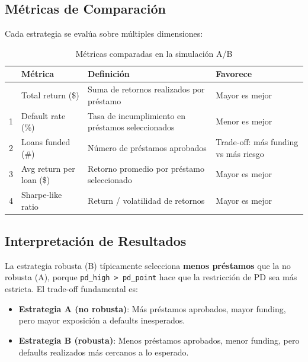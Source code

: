 \documentclass[
  spanish,
  11pt,
  letterpaper,
]{scrbook}
\providecommand{\tightlist}{%
  \setlength{\itemsep}{0pt}\setlength{\parskip}{0pt}}
\theoremstyle{plain}
\theoremstyle{remark}
\begin{document}
\subsection{Métricas de
Comparación}\label{muxe9tricas-de-comparaciuxf3n}

Cada estrategia se evalúa sobre múltiples dimensiones:

{

\begin{longtable}[]{@{}llll@{}}

\caption{\label{tbl-ab-metrics}Métricas comparadas en la simulación A/B}

\tabularnewline

\toprule\noalign{}
& Métrica & Definición & Favorece \\
\midrule\noalign{}
\endhead
\bottomrule\noalign{}
\endlastfoot
0 & Total return (\$) & Suma de retornos realizados por préstamo & Mayor
es mejor \\
1 & Default rate (\%) & Tasa de incumplimiento en préstamos
seleccionados & Menor es mejor \\
2 & Loans funded (\#) & Número de préstamos aprobados & Trade-off: más
funding vs más riesgo \\
3 & Avg return per loan (\$) & Retorno promedio por préstamo
seleccionado & Mayor es mejor \\
4 & Sharpe-like ratio & Return / volatilidad de retornos & Mayor es
mejor \\

\end{longtable}

}

\subsection{Interpretación de
Resultados}\label{interpretaciuxf3n-de-resultados}

La estrategia robusta (B) típicamente selecciona \textbf{menos
préstamos} que la no robusta (A), porque
\texttt{pd\_high\ \textgreater{}\ pd\_point} hace que la restricción de
PD sea más estricta. El trade-off fundamental es:

\begin{itemize}
\tightlist
\item
  \textbf{Estrategia A (no robusta)}: Más préstamos aprobados, mayor
  funding, pero mayor exposición a defaults inesperados.
\item
  \textbf{Estrategia B (robusta)}: Menos préstamos aprobados, menor
  funding, pero defaults realizados más cercanos a lo esperado.
\end{itemize}
\end{document}
